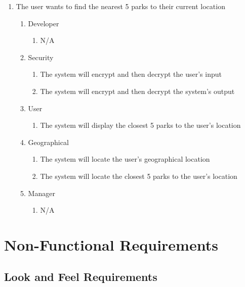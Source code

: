 \documentclass[titlepage]{article}
\newcounter{myCounter}
\begin{document}
\begin{enumerate}[{BE}1.]
    \item The user wants to find the nearest 5 parks to their current location
    \begin{enumerate}[{VP\theenumi}.1]
        \item Developer
            \begin{enumerate}
                \item N/A
            \end{enumerate}
        \item Security
            \begin{enumerate}
                \item The system will encrypt and then decrypt the user's input
                \item The system will encrypt and then decrypt the system's output
            \end{enumerate}
        \item User
            \begin{enumerate}
                \item The system will display the closest 5 parks to the user's location
            \end{enumerate}
        \item Geographical
            \begin{enumerate}
                \item The system will locate the user's geographical location
                \item The system will locate the closest 5 parks to the user's location
            \end{enumerate}
        \item Manager
            \begin{enumerate}
                \item N/A
            \end{enumerate}
    \end{enumerate}


\end{enumerate}

\section{Non-Functional Requirements}
\label{sec:non-functional_requirements}
\subsection{Look and Feel Requirements}
\label{sub:look_and_feel_requirements}
\setcounter{myCounter}{0}
\end{document}
